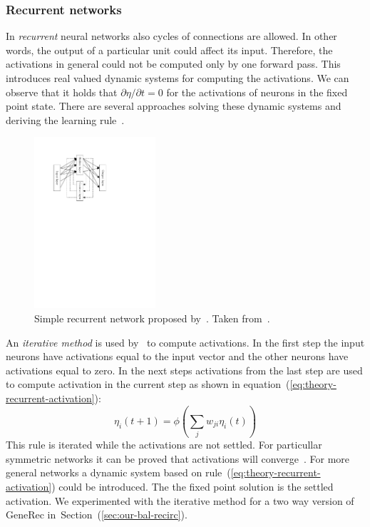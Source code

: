 \subsubsection{Recurrent networks}
\label{sec:theory-recurrent} 

In \emph{recurrent} neural networks also cycles of connections are allowed. In other words, the output of a particular unit could affect its input. Therefore, the activations in general could not be computed only by one forward pass. This introduces real valued dynamic systems for computing the activations. We can observe that it holds that $\partial\eta / \partial t = 0$ for the activations of neurons in the fixed point state. There are several approaches solving these dynamic systems and deriving the learning rule~\citep{pineda1987generalization, pearlmutter1989learning, williams1989learning, elman1990finding, haykin1994neural}. 

\begin{figure}[H]
  \centering
  \includegraphics[width=0.4\textwidth]{img/models-recurrent.pdf}    
  \caption{Simple recurrent network proposed by~\citet{elman1990finding}. Taken from~\citet{haykin1994neural}.} 
  \label{fig:theory-recurrent}
\end{figure}

An \emph{iterative method} is used by~\citet{movellan1990contrastive} to compute activations. In the first step the input neurons have activations equal to the input vector and the other neurons have activations equal to zero. In the next steps activations from the last step are used to compute activation in the current step as shown in equation~(\ref{eq:theory-recurrent-activation}): 
\begin{equation}
  \label{eq:theory-recurrent-activation} 
  \eta_i(t+1) = \phi\left(\sum_j w_{ji}\eta_i(t)\right) 
\end{equation}
This rule is iterated while the activations are not settled. For particullar symmetric networks it can be proved that activations will converge~\citep{o1996bio}. For more general networks a dynamic system based on rule~(\ref{eq:theory-recurrent-activation}) could be introduced. The the fixed point solution is the settled activation. We experimented with the iterative method for a two way version of GeneRec in~Section~(\ref{sec:our-bal-recirc}). 

